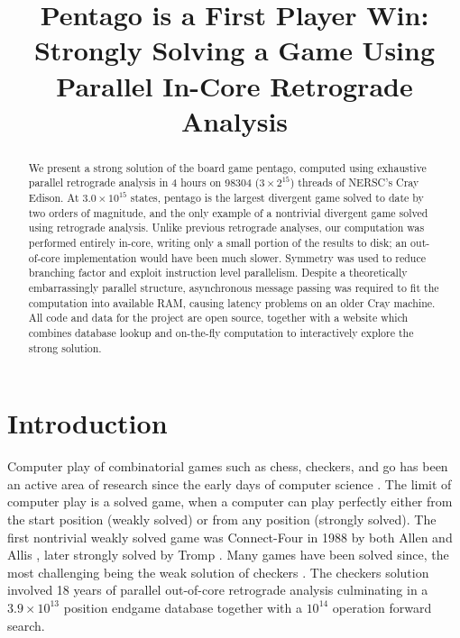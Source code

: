 \documentclass[conference]{IEEEtran}
\begin{document}
\title{Pentago is a First Player Win: Strongly Solving a Game Using Parallel In-Core Retrograde Analysis}
\author{}

\maketitle

\begin{abstract}
\boldmath
We present a strong solution of the board game pentago, computed using exhaustive parallel
retrograde analysis in 4 hours on 98304 ($3 \times 2^{15}$) threads of NERSC's Cray Edison.
At $3.0 \times 10^{15}$ states, pentago is the largest divergent game solved to date by
two orders of magnitude, and the only example of a nontrivial divergent game solved
using retrograde analysis.
Unlike previous retrograde analyses, our computation was performed entirely in-core,
writing only a small portion of the results to disk; an out-of-core implementation would
have been much slower.  Symmetry was used to reduce branching factor
and exploit instruction level parallelism.  Despite a theoretically
embarrassingly parallel structure, asynchronous message passing was required to fit the
computation into available RAM, causing latency problems
on an older Cray machine.  All code and data for the project are
open source, together with a website which combines database lookup and on-the-fly computation
to interactively explore the strong solution.
\end{abstract}

\IEEEpeerreviewmaketitle

\vspace{-.02in}
\section{Introduction}

Computer play of combinatorial games such as chess, checkers, and go has been an active area of research
since the early days of computer science \cite{shannon1950chess}.  The limit of computer play is a solved
game, when a computer can play perfectly either from the start position (weakly solved) or from any
position (strongly solved).  The first nontrivial weakly solved game was Connect-Four in 1988 by both
Allen and Allis \cite{allis1988connectfour}, later strongly solved by Tromp \cite{tromp1995}.  Many games
have been solved since, the most challenging being the weak solution of checkers \cite{schaeffer2007checkers}.
The checkers solution involved 18 years of parallel out-of-core retrograde analysis culminating in a
$3.9 \times 10^{13}$ position endgame database together with a $10^{14}$ operation forward search.
\end{document}
